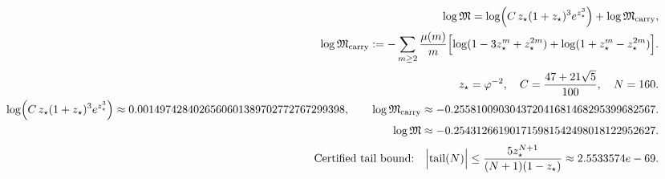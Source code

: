 \[
\begin{aligned}
\log\mathfrak{M}=\log\Bigl(C\,z_\star(1+z_\star)^3 e^{z_\star^3}\Bigr)+\log\mathfrak{M}_{\mathrm{carry}},
\\
\log\mathfrak{M}_{\mathrm{carry}}:=-\sum_{m\ge 2}\frac{\mu(m)}{m}\Bigl[\log(1-3z_\star^{m}+z_\star^{2m})+\log(1+z_\star^{m}-z_\star^{2m})\Bigr].
\\[2pt]
z_\star=\varphi^{-2},\quad C=\frac{47+21\sqrt5}{100},\quad N=160.
\\
\log\Bigl(C\,z_\star(1+z_\star)^3 e^{z_\star^3}\Bigr)\approx 0.0014974284026560601389702772767299398,\qquad \log\mathfrak{M}_{\mathrm{carry}}\approx -0.255810090304372041681468295399682567.
\\
\log\mathfrak{M}\approx -0.254312661901715981542498018122952627.
\\[2pt]
\text{Certified tail bound:}\quad\Bigl|\mathrm{tail}(N)\Bigr|\le \frac{5 z_\star^{N+1}}{(N+1)(1-z_\star)}\approx 2.5533574e-69.
\end{aligned}
\]
